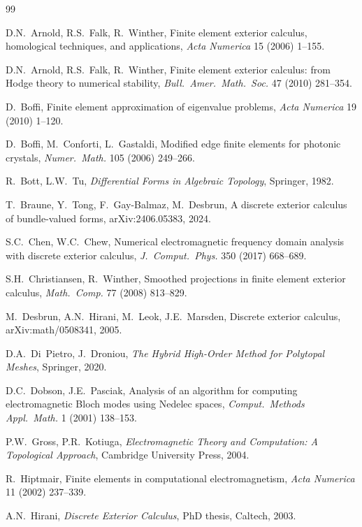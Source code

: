 \documentclass[preprint,12pt]{elsarticle}
\begin{document}
\begin{thebibliography}{99}

D.N.~Arnold, R.S.~Falk, R.~Winther,
Finite element exterior calculus, homological techniques, and applications,
\emph{Acta Numerica} 15 (2006) 1--155.

D.N.~Arnold, R.S.~Falk, R.~Winther,
Finite element exterior calculus: from Hodge theory to numerical stability,
\emph{Bull.\ Amer.\ Math.\ Soc.} 47 (2010) 281--354.

D.~Boffi,
Finite element approximation of eigenvalue problems,
\emph{Acta Numerica} 19 (2010) 1--120.

D.~Boffi, M.~Conforti, L.~Gastaldi,
Modified edge finite elements for photonic crystals,
\emph{Numer.\ Math.} 105 (2006) 249--266.

R.~Bott, L.W.~Tu,
\emph{Differential Forms in Algebraic Topology},
Springer, 1982.

T.~Braune, Y.~Tong, F.~Gay-Balmaz, M.~Desbrun,
A discrete exterior calculus of bundle-valued forms,
arXiv:2406.05383, 2024.

S.C.~Chen, W.C.~Chew,
Numerical electromagnetic frequency domain analysis with discrete exterior calculus,
\emph{J.\ Comput.\ Phys.} 350 (2017) 668--689.

S.H.~Christiansen, R.~Winther,
Smoothed projections in finite element exterior calculus,
\emph{Math.\ Comp.} 77 (2008) 813--829.

M.~Desbrun, A.N.~Hirani, M.~Leok, J.E.~Marsden,
Discrete exterior calculus,
arXiv:math/0508341, 2005.

D.A.~Di~Pietro, J.~Droniou,
\emph{The Hybrid High-Order Method for Polytopal Meshes},
Springer, 2020.

D.C.~Dobson, J.E.~Pasciak,
Analysis of an algorithm for computing electromagnetic Bloch modes using Nedelec spaces,
\emph{Comput.\ Methods Appl.\ Math.} 1 (2001) 138--153.

P.W.~Gross, P.R.~Kotiuga,
\emph{Electromagnetic Theory and Computation: A Topological Approach},
Cambridge University Press, 2004.

R.~Hiptmair,
Finite elements in computational electromagnetism,
\emph{Acta Numerica} 11 (2002) 237--339.

A.N.~Hirani,
\emph{Discrete Exterior Calculus},
PhD thesis, Caltech, 2003.


\end{thebibliography}
\end{document}

